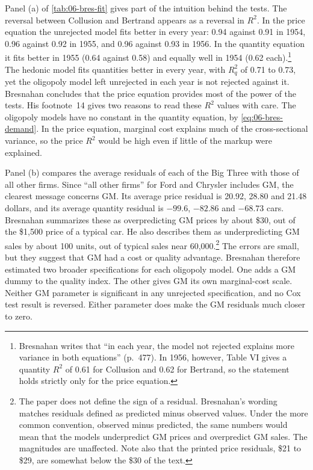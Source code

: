 Panel (a) of \cref{tab:06-bres-fit} gives part of the intuition behind the tests. The reversal between Collusion and
Bertrand appears as a reversal in $R^2$. In the price equation the unrejected model fits better in every year: 0.94
against 0.91 in 1954, 0.96 against 0.92 in 1955, and 0.96 against 0.93 in 1956. In the quantity equation it fits
better in 1955 (0.64 against 0.58) and equally well in 1954 (0.62 each).\footnote{Bresnahan writes that ``in each
year, the model not rejected explains more variance in both equations'' (p.~477). In 1956, however, Table VI gives
a quantity $R^2$ of 0.61 for Collusion and 0.62 for Bertrand, so the statement holds strictly only for the price
equation.} The hedonic model fits quantities better in every year, with $R^2_q$ of 0.71 to 0.73, yet the oligopoly
model left unrejected in each year is not rejected against it. Bresnahan concludes that the price equation provides most of the power of the
tests. His footnote~14 gives two reasons to read these $R^2$ values with care. The oligopoly models have no constant
in the quantity equation, by \eqref{eq:06-bres-demand}. In the price equation, marginal cost explains much of the
cross-sectional variance, so the price $R^2$ would be high even if little of the markup were explained.

Panel (b) compares the average residuals of each of the Big Three with those of all other firms. Since ``all other
firms'' for Ford and Chrysler includes GM, the clearest message concerns GM. Its average price residual is 20.92,
28.80 and 21.48 dollars, and its average quantity residual is $-99.6$, $-82.86$ and $-68.73$ cars. Bresnahan
summarizes these as overpredicting GM prices by about \$30, out of the \$1,500 price of a typical car. He also
describes them as underpredicting GM sales by about 100 units, out of typical sales near 60,000.\footnote{The paper does not define the
sign of a residual. Bresnahan's wording matches residuals defined as predicted minus observed values. Under the more
common convention, observed minus predicted, the same numbers would mean that the models underpredict GM prices and
overpredict GM sales. The magnitudes are unaffected. Note also that the printed price residuals, \$21 to \$29, are
somewhat below the \$30 of the text.} The errors are small, but they suggest that GM had a cost or quality advantage.
Bresnahan therefore estimated two broader specifications for each oligopoly model. One adds a GM dummy to the quality
index. The other gives GM its own marginal-cost scale. Neither GM parameter is significant in any unrejected
specification, and no Cox test result is reversed. Either parameter does make the GM residuals much closer to zero.

